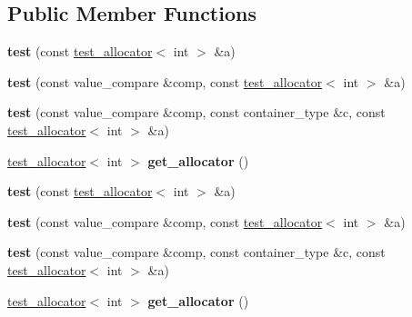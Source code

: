 \subsection*{Public Member Functions}
\begin{DoxyCompactItemize}
\item 
\mbox{\label{structtest_a6cbe38c39948288cef13b3f05a759671}} 
{\bfseries test} (const \mbox{\hyperlink{classtest__allocator}{test\+\_\+allocator}}$<$ int $>$ \&a)
\item 
\mbox{\label{structtest_a1c50367305d6ff2edfe671cbe4e3a571}} 
{\bfseries test} (const value\+\_\+compare \&comp, const \mbox{\hyperlink{classtest__allocator}{test\+\_\+allocator}}$<$ int $>$ \&a)
\item 
\mbox{\label{structtest_a4414ff2f3f26f8ccf0297f2766982745}} 
{\bfseries test} (const value\+\_\+compare \&comp, const container\+\_\+type \&c, const \mbox{\hyperlink{classtest__allocator}{test\+\_\+allocator}}$<$ int $>$ \&a)
\item 
\mbox{\label{structtest_a2c31ee85ae81b89114b3f14daca091cb}} 
\mbox{\hyperlink{classtest__allocator}{test\+\_\+allocator}}$<$ int $>$ {\bfseries get\+\_\+allocator} ()
\item 
\mbox{\label{structtest_a6cbe38c39948288cef13b3f05a759671}} 
{\bfseries test} (const \mbox{\hyperlink{classtest__allocator}{test\+\_\+allocator}}$<$ int $>$ \&a)
\item 
\mbox{\label{structtest_a1c50367305d6ff2edfe671cbe4e3a571}} 
{\bfseries test} (const value\+\_\+compare \&comp, const \mbox{\hyperlink{classtest__allocator}{test\+\_\+allocator}}$<$ int $>$ \&a)
\item 
\mbox{\label{structtest_a4414ff2f3f26f8ccf0297f2766982745}} 
{\bfseries test} (const value\+\_\+compare \&comp, const container\+\_\+type \&c, const \mbox{\hyperlink{classtest__allocator}{test\+\_\+allocator}}$<$ int $>$ \&a)
\item 
\mbox{\label{structtest_a2c31ee85ae81b89114b3f14daca091cb}} 
\mbox{\hyperlink{classtest__allocator}{test\+\_\+allocator}}$<$ int $>$ {\bfseries get\+\_\+allocator} ()

\end{DoxyCompactItemize}
